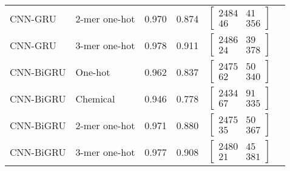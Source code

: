 \begin{longtable}{llllll}
    CNN-GRU & 2-mer one-hot & 0.970 & 0.874 &
    $\begin{bmatrix}
        2484 & 41\\ 
        46 & 356
    \end{bmatrix}$
    \\

    CNN-GRU & 3-mer one-hot & 0.978 & 0.911 &
    $\begin{bmatrix}
        2486 & 39\\ 
        24 & 378
    \end{bmatrix}$
    \\\midrule


    CNN-BiGRU & One-hot & 0.962 & 0.837 &
    $\begin{bmatrix}
        2475 & 50\\ 
        62 & 340
    \end{bmatrix}$
    \\

    CNN-BiGRU & Chemical & 0.946 & 0.778 &
    $\begin{bmatrix}
        2434 & 91\\ 
        67 & 335
    \end{bmatrix}$
    \\

    CNN-BiGRU & 2-mer one-hot & 0.971 & 0.880 &
    $\begin{bmatrix}
        2475 & 50\\ 
        35 & 367
    \end{bmatrix}$
    \\

    CNN-BiGRU & 3-mer one-hot & 0.977 & 0.908 &
    $\begin{bmatrix}
        2480 & 45\\ 
        21 & 381
    \end{bmatrix}$
    \\
    
	\bottomrule
\end{longtable}
